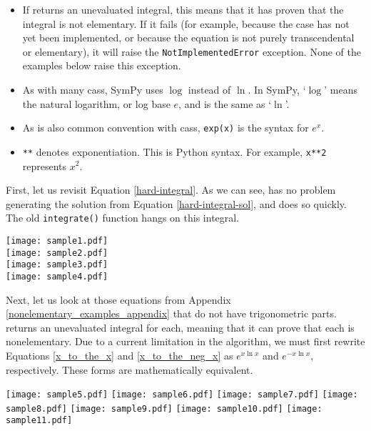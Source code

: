 \begin{itemize}
\item If \rischintegrate{} returns an unevaluated integral, this means
that it has proven that the integral is not \gls{elementary}.  If it
fails (for example, because the case has not yet been implemented, or
because the equation is not purely \gls{transcendental} or
\gls{elementary}), it will raise the \texttt{NotImplementedError}
exception.  None of the examples below raise this exception.

\item As with many \glspl{cas}, SymPy uses $\log$ instead of $\ln$. In
SymPy, `$\log$' means the natural logarithm, or log base $e$, and is the
same as `$\ln$'.

\item As is also common convention with \glspl{cas}, \texttt{exp(x)} is
the syntax for $e^x$.

\item \texttt{**} denotes exponentiation.  This is Python syntax.  For
example, \texttt{x**2} represents $x^2$.
\end{itemize}

First, let us revisit Equation \ref{hard-integral}.  As we can see,
\rischintegrate{} has no problem generating the solution from Equation
\ref{hard-integral-sol}, and does so quickly.  The old
\texttt{integrate()} function hangs on this integral.

\begin{flushleft}
\texttt{[image: sample1.pdf]}\\
\texttt{[image: sample2.pdf]}\\
\texttt{[image: sample3.pdf]}\\
\texttt{[image: sample4.pdf]}
\end{flushleft}

Next, let us look at those equations from Appendix
\ref{nonelementary_examples_appendix} that do not have
trigonometric parts.  \rischintegrate{} returns an unevaluated integral for
each, meaning that it can prove that each is nonelementary.  Due to a
current limitation in the algorithm, we must first rewrite Equations
\ref{x_to_the_x} and \ref{x_to_the_neg_x} as $e^{x\ln{x}}$ and
$e^{-x\ln{x}}$, respectively.  These forms are mathematically equivalent.

\begin{flushleft}
\texttt{[image: sample5.pdf]}
\texttt{[image: sample6.pdf]}
\texttt{[image: sample7.pdf]}
\texttt{[image: sample8.pdf]}
\texttt{[image: sample9.pdf]}
\texttt{[image: sample10.pdf]}
\texttt{[image: sample11.pdf]}
\end{flushleft}

